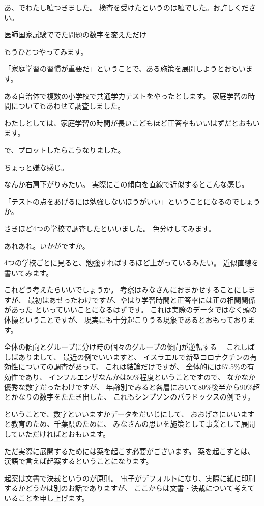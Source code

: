 \documentclass[uplatex,jis2004,dvipdfmx,12pt]{jsarticle}
\begin{document}
あ、でわたし嘘つきました。
検査を受けたというのは嘘でした。お許しください。

医師国家試験ででた問題の数字を変えただけ


もうひとつやってみます。



「家庭学習の習慣が重要だ」ということで、ある施策を展開しようとおもいます。

ある自治体で複数の小学校で共通学力テストをやったとします。
家庭学習の時間についてもあわせて調査しました。

わたしとしては、家庭学習の時間が長いこどもほど正答率もいいはずだとおもい
ます。

で、プロットしたらこうなりました。

ちょっと嫌な感じ。

なんか右肩下がりみたい。
実際にこの傾向を直線で近似するとこんな感じ。

「テストの点をあげるには勉強しないほうがいい」ということになるのでしょう
か。


さきほど4つの学校で調査したといいました。
色分けしてみます。

あれあれ。いかがですか。

4つの学校ごとに見ると、勉強すればするほど上がっているみたい。
近似直線を書いてみます。

これどう考えたらいいでしょうか。
考察はみなさんにおまかせすることにしますが、
最初はあせったわけですが、やはり学習時間と正答率には正の相関関係があった
といっていいことになるはずです。
これは実際のデータではなく頭の体操ということですが、
現実にも十分起こりうる現象であるとおもっております。

全体の傾向とグループに分け時の個々のグループの傾向が逆転する---
これしばしばありまして、
最近の例でいいますと、
イスラエルで新型コロナクチンの有効性についての調査があって、
これは結論だけですが、
全体的には67.5\%の有効性であり、
インフルエンザなんかは50\%程度ということですので、
なかなか優秀な数字だったわけですが、
年齢別でみると各層において80\%後半から90\%超とかなりの数字をたたき出した、
これもシンプソンのパラドックスの例です。

ということで、数字といいますかデータをだいじにして、
おおげさにいいますと教育のため、千葉県のために、
みなさんの思いを施策として事業として展開していただければとおもいます。

ただ実際に展開するためには案を起こす必要がございます。
案を起こすとは、漢語で言えば起案するということになります。

起案は文書で決裁というのが原則。
電子がデフォルトになり、実際に紙に印刷するかどうかは別のお話でありますが、
ここからは文書・決裁について考えていることを申し上げます。
\end{document}
